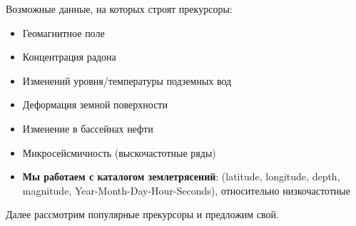 Возможные данные, на которых строят прекурсоры:

\begin{itemize}
\item Геомагнитное поле
\item Концентрация радона
\item Изменений уровня/температуры подземных вод
\item Деформация земной поверхности
\item Изменение в бассейнах нефти
\item Микросейсмичность (выскочастотные ряды)
\item \textbf{Мы работаем с каталогом землетрясений}: (latitude, longitude, depth, magnitude, Year-Month-Day-Hour-Seconds), относительно низкочастотные
\end{itemize}

Далее рассмотрим популярные прекурсоры и предложим свой.